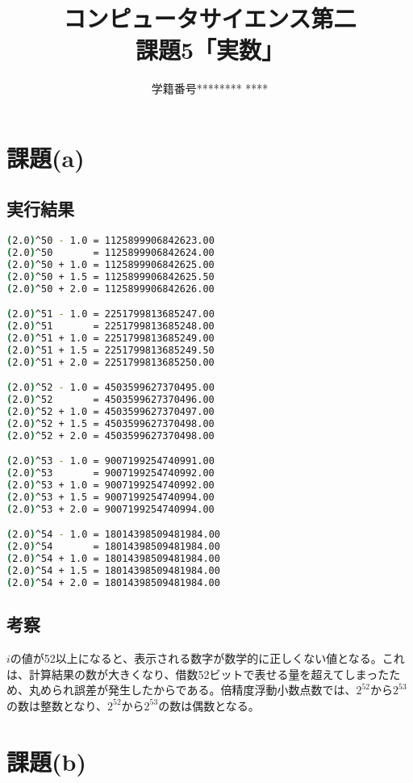 \documentclass{jsarticle}
\title{コンピュータサイエンス第二\\課題5「実数」}
\author{学籍番号******** ****}
\date{}
\begin{document}
\maketitle

\section{課題(a)}

\subsection{実行結果}

\begin{lstlisting}[language=sh]
(2.0)^50 - 1.0 = 1125899906842623.00
(2.0)^50       = 1125899906842624.00
(2.0)^50 + 1.0 = 1125899906842625.00
(2.0)^50 + 1.5 = 1125899906842625.50
(2.0)^50 + 2.0 = 1125899906842626.00

(2.0)^51 - 1.0 = 2251799813685247.00
(2.0)^51       = 2251799813685248.00
(2.0)^51 + 1.0 = 2251799813685249.00
(2.0)^51 + 1.5 = 2251799813685249.50
(2.0)^51 + 2.0 = 2251799813685250.00

(2.0)^52 - 1.0 = 4503599627370495.00
(2.0)^52       = 4503599627370496.00
(2.0)^52 + 1.0 = 4503599627370497.00
(2.0)^52 + 1.5 = 4503599627370498.00
(2.0)^52 + 2.0 = 4503599627370498.00

(2.0)^53 - 1.0 = 9007199254740991.00
(2.0)^53       = 9007199254740992.00
(2.0)^53 + 1.0 = 9007199254740992.00
(2.0)^53 + 1.5 = 9007199254740994.00
(2.0)^53 + 2.0 = 9007199254740994.00

(2.0)^54 - 1.0 = 18014398509481984.00
(2.0)^54       = 18014398509481984.00
(2.0)^54 + 1.0 = 18014398509481984.00
(2.0)^54 + 1.5 = 18014398509481984.00
(2.0)^54 + 2.0 = 18014398509481984.00
\end{lstlisting}

\subsection{考察}

$i$の値が52以上になると、表示される数字が数学的に正しくない値となる。これは、計算結果の数が大きくなり、借数52ビットで表せる量を超えてしまったため、丸められ誤差が発生したからである。倍精度浮動小数点数では、$2^{52}$から$2^{53}$の数は整数となり、$2^{52}$から$2^{53}$の数は偶数となる。

\section{課題(b)}
\end{document}
